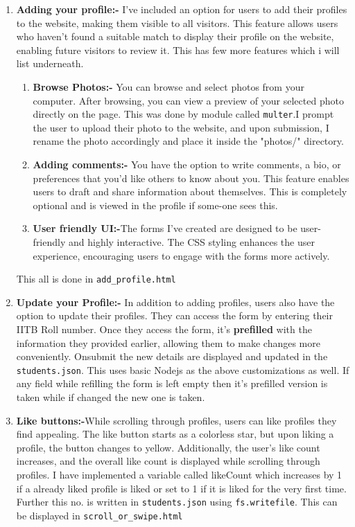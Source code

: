 \documentclass{article}
\begin{document}
\begin{enumerate}
   \item \textbf{Adding your profile:-}
   I've included an option for users to add their profiles to the website, making them visible to all visitors. This feature allows users who haven't found a suitable match to display their profile on the website, enabling future visitors to review it. This has few more features which i will list underneath.
   \begin{enumerate}
       \item \textbf{Browse Photos:-} You can browse and select photos from your computer. After browsing, you can view a preview of your selected photo directly on the page. This was done by module called \texttt{multer}.I prompt the user to upload their photo to the website, and upon submission, I rename the photo accordingly and place it inside the "photos/" directory.
       \item \textbf{Adding comments:-} You have the option to write comments, a bio, or preferences that you'd like others to know about you. This feature enables users to draft and share information about themselves. This is completely optional and is viewed in the profile if some-one sees this.
       \item \textbf{User friendly UI:-}The forms I've created are designed to be user-friendly and highly interactive. The CSS styling enhances the user experience, encouraging users to engage with the forms more actively.
   \end{enumerate}
   This all is done in \texttt{add\_profile.html}

\item \textbf{Update your Profile:-}
In addition to adding profiles, users also have the option to update their profiles. They can access the form by entering their IITB Roll number. Once they access the form, it's \textbf{prefilled} with the information they provided earlier, allowing them to make changes more conveniently. Onsubmit the new details are displayed and updated in the \texttt{students.json}. This uses basic Nodejs as the above customizations as well. If any field while refilling the form is left empty then it's prefilled version is taken while if changed the new one is taken.

\item \textbf{Like buttons:-}While scrolling through profiles, users can like profiles they find appealing. The like button starts as a colorless star, but upon liking a profile, the button changes to yellow. Additionally, the user's like count increases, and the overall like count is displayed while scrolling through profiles. I have implemented a variable called likeCount which increases by 1 if a already liked profile is liked or set to 1 if it is liked for the very first time. Further this no. is written in \texttt{students.json} using \texttt{fs.writefile}. This can be displayed in \texttt{scroll\_or\_swipe.html}


\end{enumerate}
\end{document}

